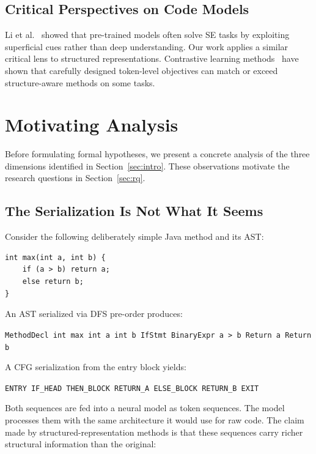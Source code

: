 \documentclass[pdflatex,sn-mathphys,Numbered]{sn-jnl}
\begin{document}
\subsection{Critical Perspectives on Code Models}

Li et al.~\citep{li2023understand} showed that pre-trained models often solve SE tasks by exploiting superficial cues rather than deep understanding. Our work applies a similar critical lens to structured representations. Contrastive learning methods~\citep{jain2021contrastive} have shown that carefully designed token-level objectives can match or exceed structure-aware methods on some tasks.

\section{Motivating Analysis}\label{sec:motive}

Before formulating formal hypotheses, we present a concrete analysis of the three dimensions identified in Section~\ref{sec:intro}. These observations motivate the research questions in Section~\ref{sec:rq}.

\subsection{The Serialization Is Not What It Seems}
\label{sec:motive-serial}

Consider the following deliberately simple Java method and its AST:

\begin{verbatim}
int max(int a, int b) {
    if (a > b) return a;
    else return b;
}
\end{verbatim}

An AST serialized via DFS pre-order produces:
\begin{center}
\texttt{MethodDecl int max int a int b IfStmt BinaryExpr a > b Return a Return b}
\end{center}

A CFG serialization from the entry block yields:
\begin{center}
\texttt{ENTRY IF\_HEAD THEN\_BLOCK RETURN\_A ELSE\_BLOCK RETURN\_B EXIT}
\end{center}

Both sequences are fed into a neural model as token sequences. The model processes them with the same architecture it would use for raw code. The claim made by structured-representation methods is that these sequences carry richer structural information than the original:
\end{document}
